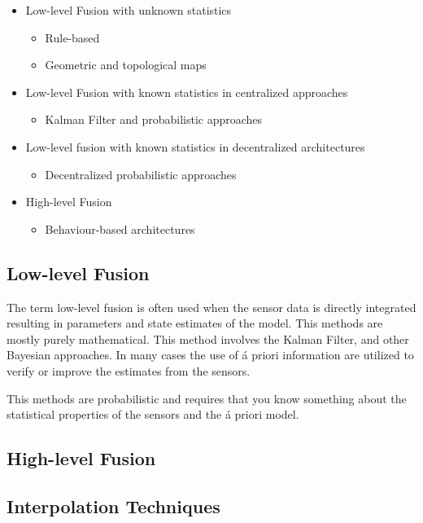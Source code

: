\begin{itemize}
    \item Low-level Fusion with unknown statistics
        \begin{itemize}
            \item Rule-based
            \item Geometric and topological maps
        \end{itemize}
    \item Low-level Fusion with known statistics in centralized approaches
        \begin{itemize}
            \item Kalman Filter and probabilistic approaches
        \end{itemize}
    \item Low-level fusion with known statistics in decentralized architectures
        \begin{itemize}
            \item Decentralized probabilistic approaches
        \end{itemize}
    \item High-level Fusion
        \begin{itemize}
            \item Behaviour-based architectures
        \end{itemize}
\end{itemize}


\subsection{Low-level Fusion}
The term low-level fusion is often used when the sensor data is directly integrated
resulting in parameters and state estimates of the model. This methods are mostly purely
mathematical. This method involves the Kalman Filter, and other Bayesian approaches. In
many cases the use of \'a priori information are utilized to verify or improve the
estimates from the sensors.

This methods are probabilistic and requires that you know something about the
statistical properties of the sensors and the \'a priori model. 


\subsection{High-level Fusion}



\subsection{Interpolation Techniques}



